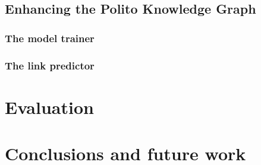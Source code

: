 \documentclass[%
    corpo=13.5pt,
    twoside,
    oldstyle,
    tipotesi=magistrale,
    greek,
    evenboxes
]{toptesi}
\begin{document}
\section{Enhancing the Polito Knowledge Graph}


\subsection{The model trainer}

\subsection{The link predictor}


\chapter{Evaluation}


\chapter{Conclusions and future work}





\end{document}
